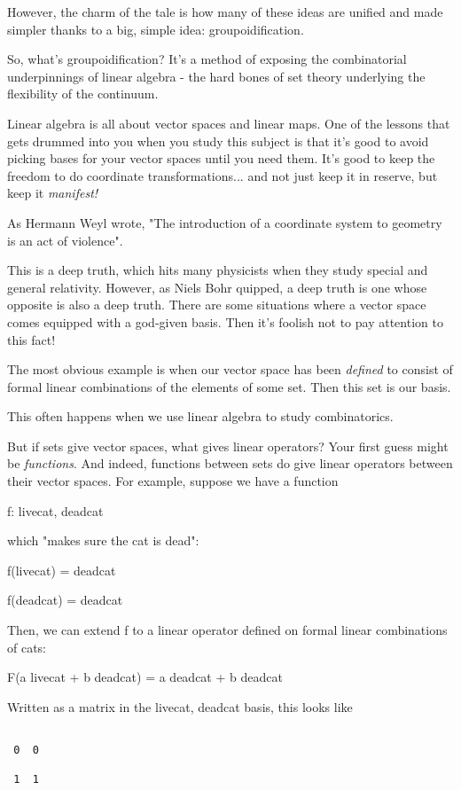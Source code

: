 However, the charm of the tale is how many of these ideas are unified
and made simpler thanks to a big, simple idea: groupoidification.

So, what's groupoidification?  It's a method of exposing the combinatorial 
underpinnings of linear algebra - the hard bones of set theory underlying
the flexibility of the continuum.

Linear algebra is all about vector spaces and linear maps.  One of the 
lessons that gets drummed into you when you study this subject is that 
it's good to avoid picking bases for your vector spaces until you need 
them.  It's good to keep the freedom to do coordinate transformations... 
and not just keep it in reserve, but keep it \emph{manifest!}

As Hermann Weyl wrote, "The introduction of a coordinate system
to geometry is an act of violence".
 
This is a deep truth, which hits many physicists when they study special 
and general relativity.  However, as Niels Bohr quipped, a deep truth is one 
whose opposite is also a deep truth.  There are some situations where
a vector space comes equipped with a god-given basis.  Then it's foolish
not to pay attention to this fact!

The most obvious example is when our vector space has been \emph{defined}
to consist of formal linear combinations of the elements of some set.  
Then this set is our basis.  

This often happens when we use linear algebra to study combinatorics.

But if sets give vector spaces, what gives linear operators?  Your
first guess might be \emph{functions}.  And indeed, functions between sets
do give linear operators between their vector spaces.  For example, 
suppose we have a function

f: {livecat, deadcat} 

which "makes sure the cat is dead":

f(livecat) = deadcat

f(deadcat) = deadcat

Then, we can extend f to a linear operator defined on formal 
linear combinations of cats: 

F(a livecat + b deadcat) = a deadcat + b deadcat

Written as a matrix in the {livecat, deadcat} basis, this looks like


\begin{verbatim}

 0  0

 1  1 
\end{verbatim}
    
